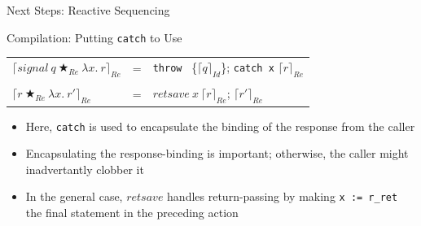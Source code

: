 \documentclass{beamer}
\begin{document}
\begin{frame}{Next Steps: Reactive Sequencing}

\begin{structure}{Compilation: Putting \texttt{catch} to Use}
\begin{onlinebox}{11cm}

\begin{tabular}[t]{lll}

$\lceil signal\ q\ \bigstar_{Re}\ \lambda x .\  r \rceil_{Re}$ &=&\texttt{throw } \{$\lceil q\rceil_{Id}$\}; \texttt{catch x} $\lceil r \rceil_{Re}$\\
\\
$\lceil r\ \bigstar_{Re}\ \lambda x .\ r\prime \rceil_{Re}$ &=& $retsave\ x\ \lceil r \rceil_{Re}$; $\lceil r\prime \rceil_{Re}$\\

\end{tabular}

\end{onlinebox}
\end{structure}

\begin{itemize}

\item{Here, \texttt{catch} is used to encapsulate the binding of the response from the caller}

\item{Encapsulating the response-binding is important; otherwise, the caller might inadvertantly clobber it}

\item{In the general case, $retsave$ handles return-passing by making \texttt{x := r\_ret} the final statement in the preceding action}

\end{itemize}

\end{frame}
\end{document}
